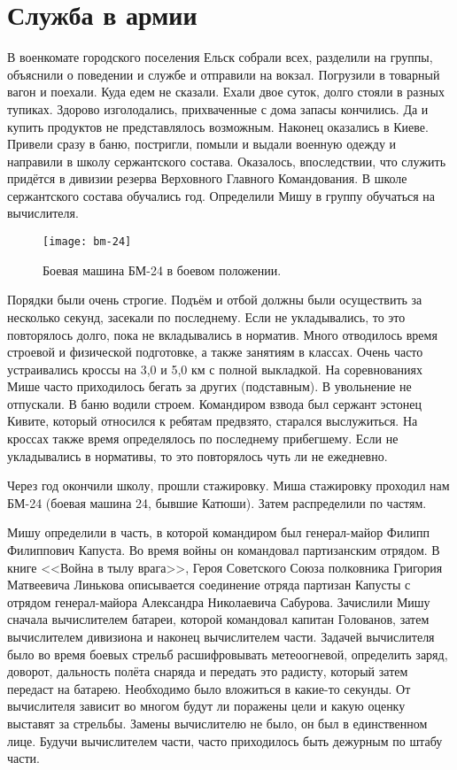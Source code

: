 ﻿\chapter{Служба в армии}
В военкомате городского поселения Ельск собрали всех, разделили на группы, объяснили о поведении и службе и отправили на вокзал. Погрузили в товарный вагон и поехали. Куда едем не сказали. Ехали двое суток, долго стояли в разных тупиках. Здорово изголодались, прихваченные с дома запасы кончились. Да и купить продуктов не представлялось возможным. Наконец оказались в Киеве. Привели сразу в баню, постригли, помыли и выдали военную одежду и направили в школу сержантского состава. Оказалось, впоследствии, что служить придётся в дивизии резерва Верховного Главного Командования. В школе сержантского состава обучались год. Определили Мишу в группу обучаться на вычислителя.

\begin{wrapfigure}{O}{.4\textwidth}
\centering
\texttt{[image: bm-24]}
\caption[Боевая машина БМ-24 в боевом положении.]{Боевая машина БМ-24 в боевом положении\footnotemark.}
\label{fig:bm-24}
\end{wrapfigure}

Порядки были очень строгие. Подъём и отбой должны были осуществить за несколько секунд, засекали по последнему. Если не укладывались, то это повторялось долго, пока не вкладывались в норматив. Много отводилось время строевой и физической подготовке, а также занятиям в классах. Очень часто устраивались кроссы на 3,0 и 5,0 км с полной выкладкой. На соревнованиях Мише часто приходилось бегать за других (подставным). В увольнение не отпускали. В баню водили строем. Командиром взвода был сержант эстонец Кивите, который относился к ребятам предвзято, старался выслужиться. На кроссах также время определялось по последнему прибегшему. Если не укладывались в нормативы, то это повторялось чуть ли не ежедневно. 

Через год окончили школу, прошли стажировку. Миша стажировку проходил нам БМ-24 (боевая машина 24, бывшие Катюши). Затем распределили по частям. 

Мишу определили в часть, в которой командиром был генерал-майор Филипп Филиппович Капуста. Во время войны он командовал партизанским отрядом. В книге <<Война в тылу врага>>, Героя Советского Союза полковника Григория Матвеевича Линькова описывается соединение отряда партизан Капусты с отрядом генерал-майора Александра Николаевича Сабурова. Зачислили Мишу сначала вычислителем батареи, которой командовал капитан Голованов, затем вычислителем дивизиона и наконец вычислителем части. Задачей вычислителя было во время боевых стрельб расшифровывать метеоогневой, определить заряд, доворот, дальность полёта снаряда и передать это радисту, который затем передаст на батарею. Необходимо было вложиться в какие-то секунды. От вычислителя зависит во многом будут ли поражены цели и какую оценку выставят за стрельбы. Замены вычислителю не было, он был в единственном лице. Будучи вычислителем части, часто приходилось быть дежурным по штабу части. 

